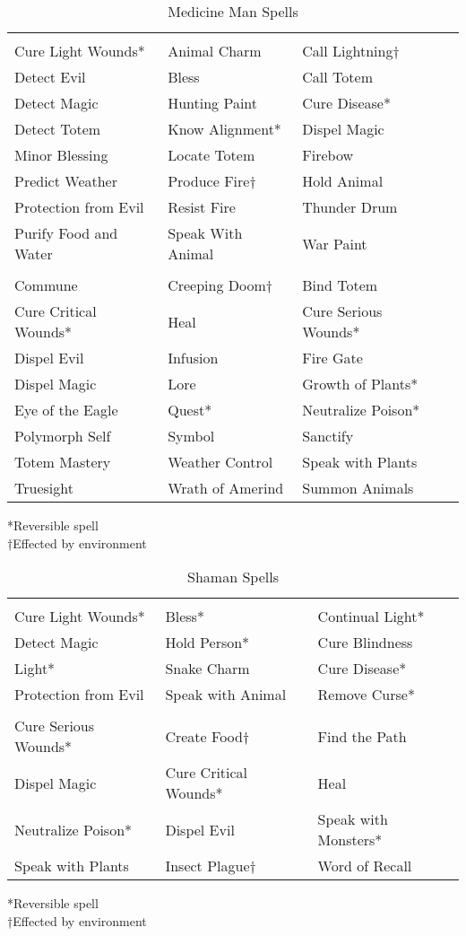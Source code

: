 \begin {table}[H]
  \caption{Medicine Man Spells}
  \begin{tabularx}{\columnwidth}{YYYY}
	 &  & \\
	Cure Light Wounds* & Animal Charm & Call Lightning†\\
	Detect Evil & Bless & Call Totem\\
	Detect Magic & Hunting Paint & Cure Disease*\\
	Detect Totem & Know Alignment* & Dispel Magic\\
	Minor Blessing & Locate Totem & Firebow\\
	Predict Weather & Produce Fire† & Hold Animal\\
	Protection from Evil & Resist Fire & Thunder Drum\\
	Purify Food and Water & Speak With Animal & War Paint\\
	 &  & \\
	Commune & Creeping Doom† & Bind Totem\\
	Cure Critical Wounds* & Heal & Cure Serious Wounds*\\
	Dispel Evil & Infusion & Fire Gate\\
	Dispel Magic & Lore & Growth of Plants*\\
	Eye of the Eagle & Quest* & Neutralize Poison*\\
	Polymorph Self & Symbol & Sanctify\\
	Totem Mastery & Weather Control & Speak with Plants\\
	Truesight & Wrath of Amerind & Summon Animals\
	\end {tabularx}
	*Reversible spell\\
	†Effected by environment
\end {table}

\begin {table}[H]
  \caption{Shaman Spells}
  \begin{tabularx}{\columnwidth}{YYY}
	 &  & \\
	Cure Light Wounds* & Bless* & Continual Light*\\
	Detect Magic & Hold Person* & Cure Blindness\\
	Light* & Snake Charm & Cure Disease*\\
	Protection from Evil & Speak with Animal & Remove Curse*\\
	 &  & \\
	Cure Serious Wounds* & Create Food† & Find the Path\\
	Dispel Magic & Cure Critical Wounds* & Heal\\
	Neutralize Poison* & Dispel Evil & Speak with Monsters*\\
	Speak with Plants & Insect Plague† & Word of Recall\
	\end {tabularx}
	*Reversible spell\\
	†Effected by environment
\end {table}

